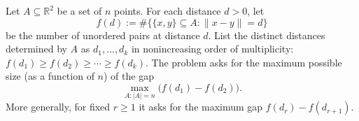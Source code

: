 Let $A\subseteq\mathbb{R}^2$ be a set of $n$ points.
For each distance $d>0$, let
\[
 f(d):=\#\{\{x,y\}\subseteq A: \|x-y\|=d\}
\]
be the number of unordered pairs at distance $d$.
List the distinct distances determined by $A$ as $d_1,\dots,d_k$ in nonincreasing order of multiplicity:
$f(d_1)\ge f(d_2)\ge\cdots\ge f(d_k)$.
The problem asks for the maximum possible size (as a function of $n$) of the gap
\[
\max_{A:|A|=n}\bigl(f(d_1)-f(d_2)\bigr).
\]
More generally, for fixed $r\ge 1$ it asks for the maximum gap $f(d_r)-f(d_{r+1})$.
